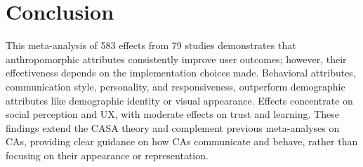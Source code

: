 \documentclass[sigconf,review,anonymous]{acmart}
\begin{document}



\section{Conclusion}

This meta-analysis of 583 effects from 79 studies demonstrates that anthropomorphic attributes consistently improve user outcomes; however, their effectiveness depends on the implementation choices made. Behavioral attributes, communication style, personality, and responsiveness, outperform demographic attributes like demographic identity or visual appearance. Effects concentrate on social perception and UX, with moderate effects on trust and learning. These findings extend the CASA theory and complement previous meta-analyses on CAs, providing clear guidance on how CAs communicate and behave, rather than focusing on their appearance or representation.



\end{document}
